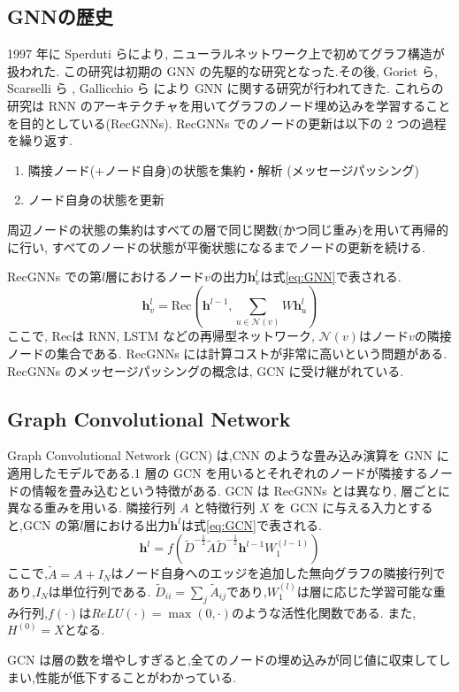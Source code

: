 \documentclass[a4j,twoside,12pt,dvipdfmx]{thesis} %
\begin{document}
\subsection{GNNの歴史}
1997 年に Sperduti ら\cite{sperduti1997supervised}により, ニューラルネットワーク上で初めてグラフ構造が扱われた. この研究は初期の GNN の先駆的な研究となった.その後, Goriet ら\cite{gori2005anew},  Scarselli ら \cite{scarselli2009the} , Gallicchio ら \cite{gallicchio2010graph} により GNN に関する研究が行われてきた.
これらの研究は RNN のアーキテクチャを用いてグラフのノード埋め込みを学習することを目的としている(RecGNNs).
RecGNNs でのノードの更新は以下の 2 つの過程を繰り返す.
\begin{enumerate}
  \item 隣接ノード(+ノード自身)の状態を集約・解析 (メッセージパッシング)
  \item ノード自身の状態を更新
\end{enumerate}
周辺ノードの状態の集約はすべての層で同じ関数(かつ同じ重み)を用いて再帰的に行い, すべてのノードの状態が平衡状態になるまでノードの更新を続ける.
\par RecGNNs での第$l$層におけるノード$v$の出力$\mathbf{h}_{v}^{l}$は式\ref{eq:GNN}で表される.
\begin{equation}
  \label{eq:GNN}
  \mathbf{h}_{v}^{l}=\mathrm{Rec}(\mathbf{h}^{l-1}, \sum_{u \in \mathcal{N}(v)} W \mathbf{h}_{u}^{l})
\end{equation}
ここで, $\mathrm{Rec}$は RNN, LSTM などの再帰型ネットワーク, $\mathcal{N}(v)$はノード$v$の隣接ノードの集合である.
RecGNNs には計算コストが非常に高いという問題がある.
RecGNNs のメッセージパッシングの概念は, GCN に受け継がれている.
\subsection{Graph Convolutional Network}
Graph Convolutional Network (GCN) \cite{kipf2017semi} は,CNN のような畳み込み演算を GNN に適用したモデルである.1 層の GCN を用いるとそれぞれのノードが隣接するノードの情報を畳み込むという特徴がある. GCN は RecGNNs とは異なり, 層ごとに異なる重みを用いる.
隣接行列 $A$ と特徴行列 $X$ を GCN に与える入力とすると,GCN の第$l$層における出力$\mathbf{h}^{l}$は式\ref{eq:GCN}で表される.
\begin{equation}
  \label{eq:GCN}
  \mathbf{h}^{l}=f(\tilde{D}^{-\frac{1}{2}}\tilde{A}\tilde{D}^{-\frac{1}{2}}\mathbf{h}^{l-1}W_{1}^{(l-1)})
\end{equation}
ここで,$\tilde{A} = A + I_{N}$はノード自身へのエッジを追加した無向グラフの隣接行列であり,$I_N$は単位行列である.
$\tilde{D}_{ii} = \sum_{j} \tilde{A}_{ij}$であり,$W_{1}^{(l)}$は層に応じた学習可能な重み行列,$f(\cdot)$は$ReLU(\cdot) = \max (0, \cdot)$のような活性化関数である.
また,$H^{(0)}=X$となる.\par
GCN は層の数を増やしすぎると,全てのノードの埋め込みが同じ値に収束してしまい,性能が低下することがわかっている.
\end{document}
